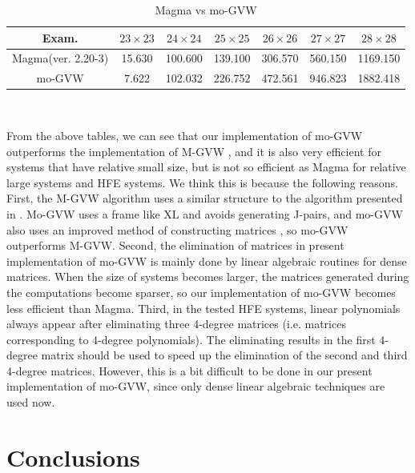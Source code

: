 \documentclass[final, number, 3p,12pt]{elsarticle}
\begin{document}
{
\begin{table}[H]\centering
\medskip
\begin{tabular}{c c c c c c c}
\hline
Exam. & $23 \times 23$ & $24 \times 24$ & $25 \times 25$ & $26 \times 26$ & $27 \times 27$ & $28 \times 28$ \\ \hline

Magma(ver. 2.20-3) & 15.630 & 100.600 & 139.100 & 306.570 & 560.150 & 1169.150 \\


mo-GVW & 7.622 & 102.032 & 226.752 & 472.561 & 946.823 & 1882.418 \\

\hline
\end{tabular}\\
\caption{\small  Magma vs mo-GVW}
\end{table}
}




From the above tables, we can see that our implementation of mo-GVW outperforms the implementation of M-GVW \citep{SunDW14}, and it is also very efficient for systems that have relative small size, but is not so efficient as Magma for relative large systems and HFE systems. We think this is because the following reasons. First, the M-GVW algorithm uses a similar structure to the algorithm presented in \citep{Albrecht10}. Mo-GVW uses a frame like XL and avoids generating J-pairs, and mo-GVW also uses an improved method of constructing matrices \citep{SunDW13}, so mo-GVW outperforms M-GVW. Second, the elimination of matrices in present implementation of mo-GVW is mainly  done by linear algebraic routines for dense matrices. When the size of systems becomes larger, the matrices generated during the computations become sparser, so our implementation of mo-GVW becomes less efficient than Magma. Third, in the tested HFE systems, linear polynomials always appear after eliminating three 4-degree matrices (i.e. matrices corresponding to 4-degree polynomials). The eliminating results in the first 4-degree matrix should be used to speed up the elimination of the second and third 4-degree matrices. However, this is a bit difficult to be done in our present implementation of  mo-GVW, since only dense linear algebraic techniques are used now. 









\section{Conclusions} \label{sec_conclusion}
\end{document}
